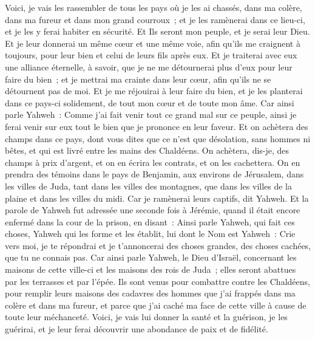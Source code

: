 \begin{multicols}{2}
Voici, je vais les rassembler de tous les pays où je les ai chassés, dans ma colère, dans ma fureur et dans mon grand courroux~; et je les ramènerai dans ce lieu-ci, et je les y ferai habiter en sécurité.
Et Ils seront mon peuple, et je serai leur Dieu.
Et je leur donnerai un même cœur et une même voie, afin qu'ils me craignent à toujours, pour leur bien et celui de leurs fils après eux.
Et je traiterai avec eux une alliance éternelle, à savoir, que je ne me détournerai plus d'eux pour leur faire du bien~; et je mettrai ma crainte dans leur cœur, afin qu'ils ne se détournent pas de moi.
Et je me réjouirai à leur faire du bien, et je les planterai dans ce pays-ci solidement, de tout mon cœur et de toute mon âme.
Car ainsi parle Yahweh~: Comme j'ai fait venir tout ce grand mal sur ce peuple, ainsi je ferai venir sur eux tout le bien que je prononce en leur faveur.
Et on achètera des champs dans ce pays, dont vous dites que ce n'est que désolation, sans hommes ni bêtes, et qui est livré entre les mains des Chaldéens.
On achètera, dis-je, des champs à prix d'argent, et on en écrira les contrats, et on les cachettera. On en prendra des témoins dans le pays de Benjamin, aux environs de Jérusalem, dans les villes de Juda, tant dans les villes des montagnes, que dans les villes de la plaine et dans les villes du midi. Car je ramènerai leurs captifs, dit Yahweh.
\VerseOne{}Et la parole de Yahweh fut adressée une seconde fois à Jérémie, quand il était encore enfermé dans la cour de la prison, en disant~:
Ainsi parle Yahweh, qui fait ces choses, Yahweh qui les forme et les établit, lui dont le Nom est Yahweh~:
Crie vers moi, je te répondrai et je t'annoncerai des choses grandes, des choses cachées, que tu ne connais pas.
Car ainsi parle Yahweh, le Dieu d'Israël, concernant les maisons de cette ville-ci et les maisons des rois de Juda~; elles seront abattues par les terrasses et par l'épée.
Ils sont venus pour combattre contre les Chaldéens, pour remplir leurs maisons des cadavres des hommes que j'ai frappés dans ma colère et dans ma fureur, et parce que j'ai caché ma face de cette ville à cause de toute leur méchanceté.
Voici, je vais lui donner la santé et la guérison, je les guérirai, et je leur ferai découvrir une abondance de paix et de fidélité.

\end{multicols}
